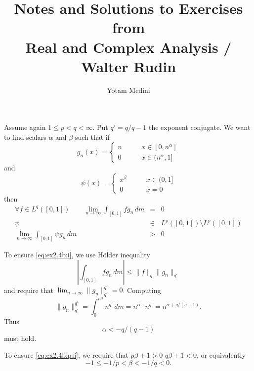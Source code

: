 \documentclass[11pt,twoside,a4paper]{book}
\title{Notes and Solutions to Exercises \\
          from \\
       Real and Complex Analysis / Walter Rudin}
\author{Yotam Medini}
\begin{document}
  Assume again \(1\leq p < q < \infty\). 
  Put \(q' = q/q-1\) the exponent conjugate.
  We want to find scalars \(\alpha\) and \(\beta\) such that if
  \begin{equation*}
    g_n(x) = \left\{\begin{array}{ll}
                     n & \qquad x \in [0,n^\alpha] \\
                     0 & \qquad x \in (n^\alpha, 1]
                    \end{array}\right.
  \end{equation*}
  and 
  \begin{equation*}
    \psi(x) = \left\{\begin{array}{ll}
                      x^\beta & \qquad x\in (0,1] \\
                      0       & \qquad x = 0
                    \end{array}\right.
  \end{equation*}
  then
  \begin{eqnarray}
   \forall f\in L^q([0,1])\qquad 
   \lim_{n\to \infty} \int_{[0,1]} fg_n\,dm &=& 0
                         \label{eq:ex2.4b:i} \\
   \psi &\in&  L^p([0,1]) \setminus L^p([0,1])
                         \label{eq:ex2.4b:psi} \\
   \lim_{n\to \infty} \int_{[0,1]} \psi g_n\,dm &>& 0
                         \label{eq:ex2.4b:iii}
  \end{eqnarray}

  To ensure \eqref{eq:ex2.4b:i}, we use H\"older inequality
  \begin{equation*}
  \left|\int_{[0,1]} fg_n\,dm \right| \leq \|f\|_q \|g_n\|_{q'}
  \end{equation*}
  and require that
  \(\lim_{n\to\infty} \|g_n\|_{q'}^{q'} = 0.\)
  Computing
  \begin{equation*}
   \|g_n\|_{q'}^{q'} = \int_0^{n^\alpha} n^{q'}\,dm 
   = n^\alpha \cdot n^{q'} = n^{\alpha + q/(q-1)}.
  \end{equation*}
  Thus 
  \begin{equation} \label{eq:ex2.4b:alpha}
  \alpha < -q/(q-1)
  \end{equation}
  must hold.

  To ensure \eqref{eq:ex2.4b:psi}, we require that 
  \(p\beta + 1 > 0\)
  \(q\beta + 1 < 0\), or equivalently
  \begin{equation} \label{eq:ex2.4b:beta1}
   -1 \leq -1/p < \beta < -1/q < 0.
  \end{equation}
\end{document}
